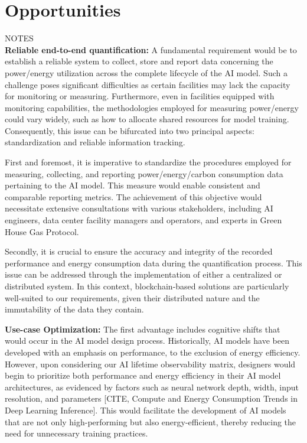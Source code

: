 \section{Opportunities}
\label{opportunities}
NOTES \\
\textbf{Reliable end-to-end quantification:} A fundamental requirement would be to establish a reliable system to collect, store and report data concerning the power/energy utilization across the complete lifecycle of the AI model. Such a challenge poses significant difficulties as certain facilities may lack the capacity for monitoring or measuring. Furthermore, even in facilities equipped with monitoring capabilities, the methodologies employed for measuring power/energy could vary widely, such as how to allocate shared resources for model training. Consequently, this issue can be bifurcated into two principal aspects: standardization and reliable information tracking.

First and foremost, it is imperative to standardize the procedures employed for measuring, collecting, and reporting power/energy/carbon consumption data pertaining to the AI model. This measure would enable consistent and comparable reporting metrics. The achievement of this objective would necessitate extensive consultations with various stakeholders, including AI engineers, data center facility managers and operators, and experts in Green House Gas Protocol.

Secondly, it is crucial to ensure the accuracy and integrity of the recorded performance and energy consumption data during the quantification process. This issue can be addressed through the implementation of either a centralized or distributed system. In this context, blockchain-based solutions are particularly well-suited to our requirements, given their distributed nature and the immutability of the data they contain.

\textbf{Use-case Optimization:} The first advantage includes cognitive shifts that would occur in the AI model design process. Historically, AI models have been developed with an emphasis on performance, to the exclusion of energy efficiency. However, upon considering our AI lifetime observability matrix, designers would begin to prioritize both performance and energy efficiency in their AI model architectures, as evidenced by factors such as neural network depth, width, input resolution, and parameters [CITE, Compute and Energy Consumption Trends in Deep Learning Inference]. This would facilitate the development of AI models that are not only high-performing but also energy-efficient, thereby reducing the need for unnecessary training practices.

